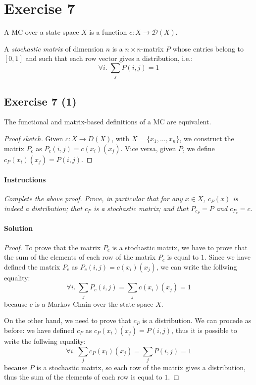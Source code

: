 \section*{Exercise 7}

\begin{definition} 
    \normalfont A MC over a state space $X$ is a function $ c: X \to \mathcal{D}(X) $.
\end{definition}
\begin{definition}
    \normalfont A \textit{stochastic matrix} of dimension $n$ is a $ n \times n$-matrix $P$ whose entries belong to $[0, 1]$ and
    such that each row vector gives a distribution, i.e.:
    \[ \forall i.\; \sum_{j} P(i, j) = 1 \]
\end{definition}

\subsection*{Exercise 7 (1)}
\begin{proposition}
    The functional and matrix-based definitions of a MC are equivalent.
\end{proposition}

\begin{proof}[Proof sketch]
    Given $ c : X \to  D(X) $, with $ X = \{x_{1}, . . . , x_{n}\} $, we construct the 
    matrix $ P_{c} $ as $ P_{c}(i, j) = c(x_{i})(x_{j}) $. 
    Vice versa, given $ P $, we define $ c_{P}(x_{i})(x_{j}) = P(i, j) $.
\end{proof}

\paragraph{Instructions} \textit{Complete the above proof. Prove, in particular that for any $ x \in X $, $ c_{P} (x) $ is indeed a 
distribution; that $ c_{P} $ is a stochastic matrix; and that $ P_{c_{P}} = P $ and $ c_{P_{c}} = c $.}

\paragraph{Solution}
\begin{proof}
    To prove that the matrix $P_{c}$ is a stochastic matrix, we have to prove that the sum of the elements of each row of the matrix
    $P_{c}$ is equal to $1$.
    Since we have defined the matrix $P_{c}$ as $ P_{c}(i, j) = c(x_{i})(x_{j}) $, we can write the follwing equality:
    \[ \forall i.\;\sum_{j} P_{c}(i, j) = \sum_{j} c(x_{i})(x_{j}) = 1 \]
    because $c$ is a Markov Chain over the state space $X$.

   On the other hand, we need to prove that $c_{P}$ is a distribution. We can procede as before: we have defined $c_{P}$ as
   $ c_{P}(x_{i})(x_{j}) = P(i, j)$, thus it is possible to write the follwing equality:
   \[ \forall i.\;\sum_{j} c_{P}(x_{i})(x_{j}) = \sum_{j} P(i, j) = 1 \]
   because $P$ is a stochastic matrix, so each row of the matrix gives a distribution, thus the sum of the elements of each row is
   equal to $1$.
\end{proof}


